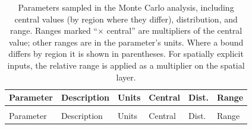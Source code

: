 \documentclass[
  letterpaper,
  twoside,
  twocolumn,
  9pt]{article}
\begin{document}
\begin{longtable}[t]{>{\raggedright\arraybackslash}p{3.3cm}>{\raggedright\arraybackslash}p{4.1cm}>{\raggedright\arraybackslash}p{2.1cm}>{\raggedright\arraybackslash}p{2.2cm}>{\raggedright\arraybackslash}p{0.9cm}>{\raggedright\arraybackslash}p{2.6cm}}

\caption{\label{tbl-si-mc}Parameters sampled in the Monte Carlo
analysis, including central values (by region where they differ),
distribution, and range. Ranges marked ``× central'' are multipliers of
the central value; other ranges are in the parameter's units. Where a
bound differs by region it is shown in parentheses. For spatially
explicit inputs, the relative range is applied as a multiplier on the
spatial layer.}

\tabularnewline

\toprule
Parameter & Description & Units & Central & Dist. & Range\\
\midrule
\endfirsthead
\multicolumn{6}{@{}l}{\textit{(continued)}}\\
\toprule
Parameter & Description & Units & Central & Dist. & Range\\
\midrule
\endhead


\end{longtable}
\end{document}
